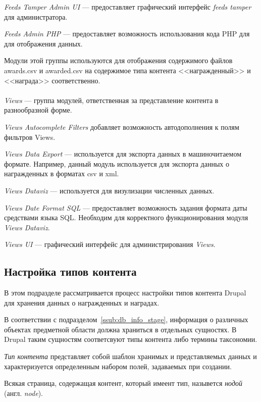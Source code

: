 \textit{Feeds Tamper Admin UI} --- предоставляет графический интерфейс
\textit{feeds tamper} для администратора.

\textit{Feeds Admin PHP} --- предоставляет возможность использования кода PHP для 
для отображения данных.

Модули этой группы используются для отображения содержимого файлов awards.csv и awarded.csv 
на содержимое типа контента <<награжденный>> и <<награда>> соответственно. 

\paragraph{}
\textit{Views} --- группа модулей, ответственная за представление контента
в разнообразной форме.

\textit{Views Autocomplete Filters} добавляет возможность автодополнения
к полям фильтров Views.

\textit{Views Data Export} --- используется для экспорта данных в машиночитаемом формате.
Например, данный модуль используется для экспорта данных о награжденных в форматах csv и xml.

\textit{Views Dataviz} --- используется для визулизации численных данных.

\textit{Views Date Format SQL} --- предоставляет возможность задания формата даты средствами
языка SQL. Необходим для корректного функционирования модуля \textit{Views Dataviz}.

\textit{Views UI} --- графический интерфейс для администрирования \textit{Views}.

\subsection{Настройка типов контента}
\label{ssec:content_types_setup}

В этом подразделе рассматривается процесс настройки типов контента Drupal для хранения
данных о награжденных и наградах.

В соответствии с подразделом~\ref{ssub:db_info_stage}, информация о различных 
объектах предметной области должна храниться в отдельных сущностях.
В Drupal таким сущностям соответсвуют типы контента либо термины таксономии.

\textit{Тип контента} представляет собой шаблон хранимых и представляемых данных и
характеризуется определенным набором полей, задаваемых при создании.

Всякая страница, содержащая контент, который имеент тип,
назывется \textit{нодой} (англ. \textit{node}).

